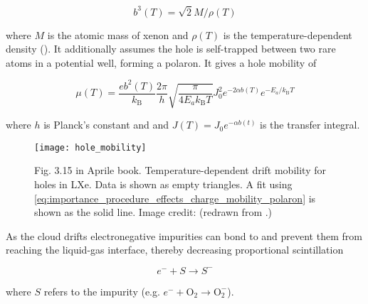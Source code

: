 \begin{equation}
b^3(T) = \sqrt{2} M / \rho (T)
\end{equation}

\noindent where $M$ is the atomic mass of xenon and $\rho (T)$ is the temperature-dependent density ().  It
additionally assumes the hole is self-trapped between two rare atoms in a potential well, forming a polaron.  It gives a hole mobility of

\begin{equation}
\mu (T) = \frac{e b^2 (T)}{k_{\mathrm{B}}} \frac{2 \pi}{h} \sqrt{\frac{\pi}{4 E_a k_{\mathrm{B}} T}} J_0^2
e^{-2 \alpha b(T)} e^{-E_a / k_{\mathrm{B}} T}
\label{eq:importance_procedure_effects_charge_mobility_polaron}
\end{equation}

\noindent where $h$ is Planck's constant and and $J(T) = J_0 e^{-\alpha b(t)}$ is the transfer integral.

\begin{figure}
\centering
\texttt{[image: hole\_mobility]}
\caption{Fig. 3.15 in Aprile book.  Temperature-dependent drift mobility for holes in LXe.  Data is shown as empty triangles.  A fit
using \eqref{eq:importance_procedure_effects_charge_mobility_polaron} is shown as the solid line.  Image credit: 
(redrawn from .)}
\label{fig:importance_procedure_effects_charge_hole_mobility}
\end{figure}

As the cloud drifts electronegative impurities can bond to \electron and prevent them from reaching the liquid-gas interface, thereby
decreasing proportional scintillation

\begin{equation}
e^{-} + S \rightarrow S^{-}
\label{eq:impurity_attach}
\end{equation}

\noindent where $S$ refers to the impurity (e.g. $e^- + \mathrm{O_2} \rightarrow \mathrm{O_2^-}$).

